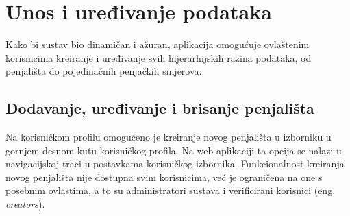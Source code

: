 \section{Unos i uređivanje podataka}

Kako bi sustav bio dinamičan i ažuran, aplikacija omogućuje ovlaštenim korisnicima kreiranje i uređivanje svih hijerarhijskih razina podataka, od penjališta do pojedinačnih penjačkih smjerova.

\subsection{Dodavanje, uređivanje i brisanje penjališta}

Na korisničkom profilu omogućeno je kreiranje novog penjališta u izborniku u gornjem desnom kutu korisničkog profila. Na web aplikaciji ta opcija se nalazi u navigacijskoj traci u postavkama korisničkog izbornika. Funkcionalnost kreiranja novog penjališta nije dostupna svim korisnicima, već je ograničena na one s posebnim ovlastima, a to su administratori sustava i verificirani korisnici (eng. \textit{creators}). 

